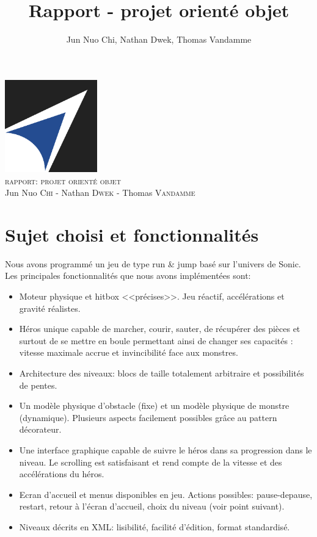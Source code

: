\documentclass[a4paper, 12pt]{article}
\title{Rapport - projet orienté objet}
\author{Jun Nuo Chi, Nathan Dwek, Thomas Vandamme}
\begin{document}
\begin{center}
  \includegraphics[width=0.3\textwidth]{EPB.jpg}~\\[.5cm]

\textsc{\Large rapport: projet orienté objet}\\
Jun Nuo \textsc{Chi} - Nathan \textsc{Dwek} - Thomas \textsc{Vandamme}
\end{center}

\section{Sujet choisi et fonctionnalités}

Nous avons programmé un jeu de type run \& jump basé sur l'univers de Sonic. Les principales fonctionnalités que nous avons implémentées sont:
\begin{itemize}

\item Moteur physique et hitbox <<précises>>. Jeu réactif, accélérations et gravité réalistes.
\item Héros unique capable de marcher, courir, sauter, de récupérer des pièces et surtout de se mettre en boule permettant ainsi de changer ses capacités : vitesse maximale accrue et invincibilité face aux monstres.
\item Architecture des niveaux: blocs de taille totalement arbitraire et possibilités de pentes.
\item Un modèle physique d'obstacle (fixe) et un modèle physique de monstre (dynamique). Plusieurs aspects facilement possibles grâce au pattern décorateur.
\item Une interface graphique capable de suivre le héros dans sa progression dans le niveau. Le scrolling est satisfaisant et rend compte de la vitesse et des accélérations du héros.
\item Ecran d'accueil et menus disponibles en jeu. Actions possibles: pause-depause, restart, retour à l'écran d'accueil, choix du niveau (voir point suivant).
\item Niveaux décrits en XML: lisibilité, facilité d'édition, format standardisé.

\end{itemize}
\end{document}
